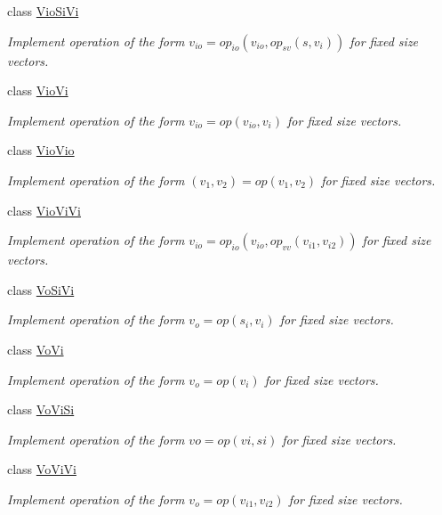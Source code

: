 \begin{DoxyCompactItemize}
class \hyperlink{classvct_fixed_size_vector_recursive_engines_1_1_vio_si_vi}{Vio\+Si\+Vi}
\begin{DoxyCompactList}\small\item\em Implement operation of the form $v_{io} = op_{io}(v_{io}, op_{sv}(s, v_i))$ for fixed size vectors. \end{DoxyCompactList}\item 
class \hyperlink{classvct_fixed_size_vector_recursive_engines_1_1_vio_vi}{Vio\+Vi}
\begin{DoxyCompactList}\small\item\em Implement operation of the form $v_{io} = op(v_{io}, v_i)$ for fixed size vectors. \end{DoxyCompactList}\item 
class \hyperlink{classvct_fixed_size_vector_recursive_engines_1_1_vio_vio}{Vio\+Vio}
\begin{DoxyCompactList}\small\item\em Implement operation of the form $(v_{1}, v_{2}) = op(v_{1}, v_{2})$ for fixed size vectors. \end{DoxyCompactList}\item 
class \hyperlink{classvct_fixed_size_vector_recursive_engines_1_1_vio_vi_vi}{Vio\+Vi\+Vi}
\begin{DoxyCompactList}\small\item\em Implement operation of the form $v_{io} = op_{io}(v_{io}, op_{vv}(v_{i1}, v_{i2}))$ for fixed size vectors. \end{DoxyCompactList}\item 
class \hyperlink{classvct_fixed_size_vector_recursive_engines_1_1_vo_si_vi}{Vo\+Si\+Vi}
\begin{DoxyCompactList}\small\item\em Implement operation of the form $v_o = op(s_i, v_i)$ for fixed size vectors. \end{DoxyCompactList}\item 
class \hyperlink{classvct_fixed_size_vector_recursive_engines_1_1_vo_vi}{Vo\+Vi}
\begin{DoxyCompactList}\small\item\em Implement operation of the form $v_o = op(v_i)$ for fixed size vectors. \end{DoxyCompactList}\item 
class \hyperlink{classvct_fixed_size_vector_recursive_engines_1_1_vo_vi_si}{Vo\+Vi\+Si}
\begin{DoxyCompactList}\small\item\em Implement operation of the form $vo = op(vi, si)$ for fixed size vectors. \end{DoxyCompactList}\item 
class \hyperlink{classvct_fixed_size_vector_recursive_engines_1_1_vo_vi_vi}{Vo\+Vi\+Vi}
\begin{DoxyCompactList}\small\item\em Implement operation of the form $v_o = op(v_{i1}, v_{i2})$ for fixed size vectors. \end{DoxyCompactList}\end{DoxyCompactItemize}



